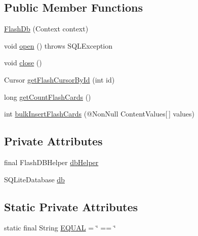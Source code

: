 \subsection*{Public Member Functions}
\begin{DoxyCompactItemize}
\item 
\hyperlink{classorg_1_1buildmlearn_1_1learnwithflashcards_1_1data_1_1FlashDb_abc3246e80aa12fdbfd782304844ad684}{Flash\+Db} (Context context)
\item 
void \hyperlink{classorg_1_1buildmlearn_1_1learnwithflashcards_1_1data_1_1FlashDb_a26fa49089f6263124879642af1979510}{open} ()  throws S\+Q\+L\+Exception 
\item 
void \hyperlink{classorg_1_1buildmlearn_1_1learnwithflashcards_1_1data_1_1FlashDb_ad08f6012d8ac5b51a6540e929da5e26f}{close} ()
\item 
Cursor \hyperlink{classorg_1_1buildmlearn_1_1learnwithflashcards_1_1data_1_1FlashDb_a89895504bbc669a2332078494c3f96e4}{get\+Flash\+Cursor\+By\+Id} (int id)
\item 
long \hyperlink{classorg_1_1buildmlearn_1_1learnwithflashcards_1_1data_1_1FlashDb_a1a480423fe0e60ff47d152334db936b3}{get\+Count\+Flash\+Cards} ()
\item 
int \hyperlink{classorg_1_1buildmlearn_1_1learnwithflashcards_1_1data_1_1FlashDb_a28b3b7aa21605086648929b9e934ca61}{bulk\+Insert\+Flash\+Cards} (@Non\+Null Content\+Values\mbox{[}$\,$\mbox{]} values)
\end{DoxyCompactItemize}
\subsection*{Private Attributes}
\begin{DoxyCompactItemize}
\item 
final Flash\+D\+B\+Helper \hyperlink{classorg_1_1buildmlearn_1_1learnwithflashcards_1_1data_1_1FlashDb_aa4f4f1766677fb1a2fb50c7b771a59d4}{db\+Helper}
\item 
S\+Q\+Lite\+Database \hyperlink{classorg_1_1buildmlearn_1_1learnwithflashcards_1_1data_1_1FlashDb_a09b4dd49dc2257badf4060a1afd7a85a}{db}
\end{DoxyCompactItemize}
\subsection*{Static Private Attributes}
\begin{DoxyCompactItemize}
\item 
static final String \hyperlink{classorg_1_1buildmlearn_1_1learnwithflashcards_1_1data_1_1FlashDb_a829e7276c4c3e65c62f653d4c814f7c7}{E\+Q\+U\+AL} = \char`\"{} == \char`\"{}
\end{DoxyCompactItemize}


